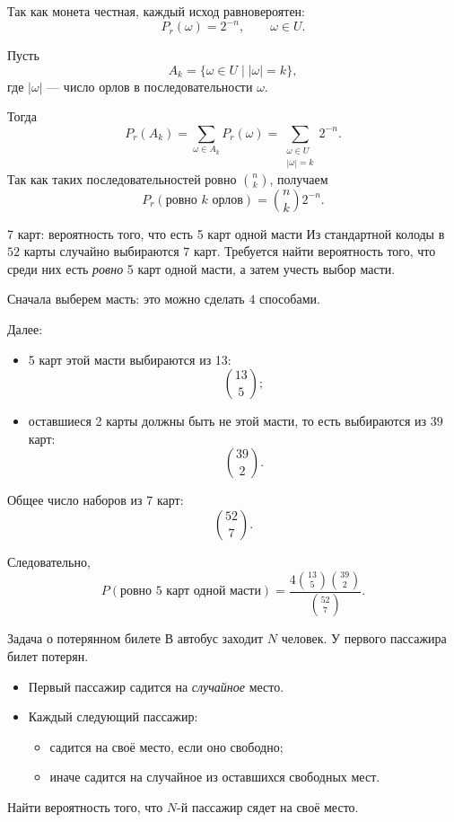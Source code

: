 		Так как монета честная, каждый исход равновероятен:
		\[
		P_r(\omega)=2^{-n}, \qquad \omega\in U.
		\]
		
	   Пусть
		\[
		A_k=\{\omega\in U \mid |\omega|=k\},
		\]
		где \(|\omega|\) --- число орлов в последовательности \(\omega\).
		
		Тогда
		\[
		P_r(A_k)=\sum_{\omega\in A_k}P_r(\omega)
		=\sum_{\substack{\omega\in U\\ |\omega|=k}}2^{-n}.
		\]
		Так как таких последовательностей ровно \(\binom{n}{k}\), получаем
		\[
		P_r(\text{ровно }k\text{ орлов})
		=
		\binom{n}{k}2^{-n}.
		\]

	
	\begin{Example}{7 карт: вероятность того, что есть 5 карт одной масти}{}
		Из стандартной колоды в \(52\) карты случайно выбираются \(7\) карт. Требуется найти вероятность того, что среди них есть \textit{ровно} 5 карт одной масти, а затем учесть выбор масти.
	\end{Example}
		
		Сначала выберем масть: это можно сделать \(4\) способами.
		
		Далее:
		\begin{itemize}
			\item 5 карт этой масти выбираются из 13:
			\[
			\binom{13}{5};
			\]
			\item оставшиеся 2 карты должны быть не этой масти, то есть выбираются из \(39\) карт:
			\[
			\binom{39}{2}.
			\]
		\end{itemize}
		
		Общее число наборов из 7 карт:
		\[
		\binom{52}{7}.
		\]
		
		Следовательно,
		\[
		P(\text{ровно 5 карт одной масти})
		=
		\frac{4\binom{13}{5}\binom{39}{2}}{\binom{52}{7}}.
		\]


	
	\begin{Example}{Задача о потерянном билете}{}
		В автобус заходит \(N\) человек. У первого пассажира билет потерян.
		
		\begin{itemize}
			\item Первый пассажир садится на \textit{случайное} место.
			\item Каждый следующий пассажир:
			\begin{itemize}
				\item садится на своё место, если оно свободно;
				\item иначе садится на случайное из оставшихся свободных мест.
			\end{itemize}
		\end{itemize}
		
		Найти вероятность того, что \(N\)-й пассажир сядет на своё место.
	\end{Example}
	
